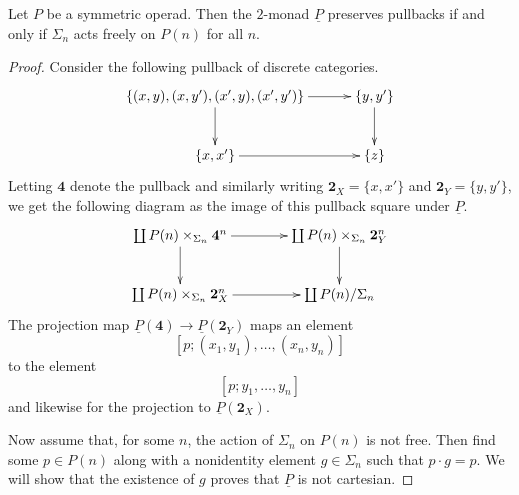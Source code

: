 \documentclass{amsbook} %
\newcommand{\mb}{\mathbf}
\numberwithin{section}{chapter}
\begin{document}
\begin{prop}
Let $P$ be a symmetric operad. Then the $2$-monad $\underline{P}$ preserves pullbacks if and only if $\Sigma_{n}$ acts freely on $P(n)$\index{} for all $n$.
\end{prop}
\begin{proof}
Consider the following pullback of discrete categories.
    \[
        \xy
            (0,0)*+{\lbrace (x,y), (x,y'), (x',y), (x',y') \rbrace}="00";
            (40,0)*+{\lbrace y,y' \rbrace}="10";
            (0,-15)*+{\lbrace x, x' \rbrace}="01";
            (40,-15)*+{\lbrace z \rbrace}="11";
            {\ar "00" ; "10"};
            {\ar "10" ; "11"};
            {\ar "00" ; "01"};
            {\ar "01" ; "11"};
        \endxy
    \]
Letting $\mathbf{4}$ denote the pullback and similarly writing $\mathbf{2}_X = \{ x, x' \}$ and $\mathbf{2}_Y = \{y, y'\}$, we get the following diagram as the image of this pullback square under $\underline{P}$.
    \[
        \xy
            (0,0)*+{\coprod P(n) \times_{\Sigma_n} \mathbf{4}^n}="00";
            (40,0)*+{\coprod P(n) \times_{\Sigma_n} \mathbf{2}_Y^n}="10";
            (0,-15)*+{\coprod P(n) \times_{\Sigma_n} \mathbf{2}_X^n}="01";
            (40,-15)*+{\coprod P(n)/\Sigma_n}="11";
            {\ar "00" ; "10"};
            {\ar "10" ; "11"};
            {\ar "00" ; "01"};
            {\ar "01" ; "11"}:
        \endxy
    \]
The projection map $\underline{P}(\mb{4}) \rightarrow \underline{P}(\mb{2}_Y)$ maps an element
    \[
        [p;(x_1,y_1), \ldots, (x_n,y_n)]
    \]
to the element
    \[
        [p;y_1,\ldots,y_n]
    \]
and likewise for the projection to $\underline{P}(\mb{2}_X)$.

Now assume that, for some $n$, the action of $\Sigma_n$ on $P(n)$ is not free. Then find some $p \in P(n)$ along with a nonidentity element $g \in \Sigma_n$ such that $p \cdot g = p$. We will show that the existence of $g$ proves that $\underline{P}$ is not cartesian.


\end{proof}
\end{document}

